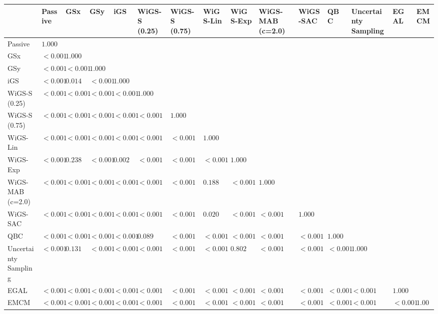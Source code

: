 \begin{tabular}{lllllllllllllll}
\toprule
 & Passive & GSx & GSy & iGS & WiGS-S (0.25) & WiGS-S (0.75) & WiGS-Lin & WiGS-Exp & WiGS-MAB (c=2.0) & WiGS-SAC & QBC & Uncertainty Sampling & EGAL & EMCM \\
\midrule
Passive & $1.000$ &  &  &  &  &  &  &  &  &  &  &  &  &  \\
GSx & $<0.001$ & $1.000$ &  &  &  &  &  &  &  &  &  &  &  &  \\
GSy & $<0.001$ & $<0.001$ & $1.000$ &  &  &  &  &  &  &  &  &  &  &  \\
iGS & $<0.001$ & $0.014$ & $<0.001$ & $1.000$ &  &  &  &  &  &  &  &  &  &  \\
WiGS-S (0.25) & $<0.001$ & $<0.001$ & $<0.001$ & $<0.001$ & $1.000$ &  &  &  &  &  &  &  &  &  \\
WiGS-S (0.75) & $<0.001$ & $<0.001$ & $<0.001$ & $<0.001$ & $<0.001$ & $1.000$ &  &  &  &  &  &  &  &  \\
WiGS-Lin & $<0.001$ & $<0.001$ & $<0.001$ & $<0.001$ & $<0.001$ & $<0.001$ & $1.000$ &  &  &  &  &  &  &  \\
WiGS-Exp & $<0.001$ & $0.238$ & $<0.001$ & $0.002$ & $<0.001$ & $<0.001$ & $<0.001$ & $1.000$ &  &  &  &  &  &  \\
WiGS-MAB (c=2.0) & $<0.001$ & $<0.001$ & $<0.001$ & $<0.001$ & $<0.001$ & $<0.001$ & $0.188$ & $<0.001$ & $1.000$ &  &  &  &  &  \\
WiGS-SAC & $<0.001$ & $<0.001$ & $<0.001$ & $<0.001$ & $<0.001$ & $<0.001$ & $0.020$ & $<0.001$ & $<0.001$ & $1.000$ &  &  &  &  \\
QBC & $<0.001$ & $<0.001$ & $<0.001$ & $<0.001$ & $0.089$ & $<0.001$ & $<0.001$ & $<0.001$ & $<0.001$ & $<0.001$ & $1.000$ &  &  &  \\
Uncertainty Sampling & $<0.001$ & $0.131$ & $<0.001$ & $<0.001$ & $<0.001$ & $<0.001$ & $<0.001$ & $0.802$ & $<0.001$ & $<0.001$ & $<0.001$ & $1.000$ &  &  \\
EGAL & $<0.001$ & $<0.001$ & $<0.001$ & $<0.001$ & $<0.001$ & $<0.001$ & $<0.001$ & $<0.001$ & $<0.001$ & $<0.001$ & $<0.001$ & $<0.001$ & $1.000$ &  \\
EMCM & $<0.001$ & $<0.001$ & $<0.001$ & $<0.001$ & $<0.001$ & $<0.001$ & $<0.001$ & $<0.001$ & $<0.001$ & $<0.001$ & $<0.001$ & $<0.001$ & $<0.001$ & $1.000$ \\
\bottomrule
\end{tabular}
